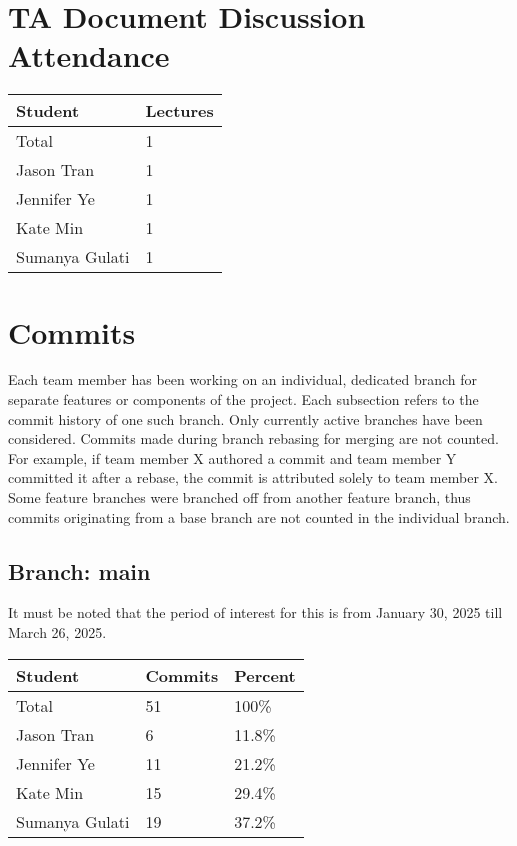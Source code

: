 \documentclass{article}
\begin{document}
\section{TA Document Discussion Attendance}

\begin{table}[H]
\centering
\begin{tabular}{ll}
\toprule
\textbf{Student} & \textbf{Lectures}\\
\midrule
Total & 1\\
Jason Tran & 1\\
Jennifer Ye & 1\\
Kate Min & 1\\
Sumanya Gulati & 1\\
\bottomrule
\end{tabular}
\end{table}

\section{Commits}
Each team member has been working on an individual, dedicated branch for
separate features or components of the project. Each subsection refers to the
commit history of one such branch. Only currently active branches have been
considered. Commits made during branch rebasing for merging are not counted. For
example, if team member X authored a commit and team member Y committed it after
a rebase, the commit is attributed solely to team member X. Some feature
branches were branched off from another feature branch, thus commits originating
from a base branch are not counted in the individual branch.

\subsection{Branch: main}
It must be noted that the period of interest for this is from January 30, 2025 till 
March 26, 2025.

\begin{table}[H]
\centering
\begin{tabular}{lll}
\toprule
\textbf{Student} & \textbf{Commits} & \textbf{Percent}\\
\midrule
Total & 51 & 100\% \\
Jason Tran & 6 & 11.8\% \\
Jennifer Ye & 11 & 21.2\% \\
Kate Min & 15 & 29.4\% \\
Sumanya Gulati & 19 & 37.2\% \\
\bottomrule
\end{tabular}
\end{table}
\end{document}

